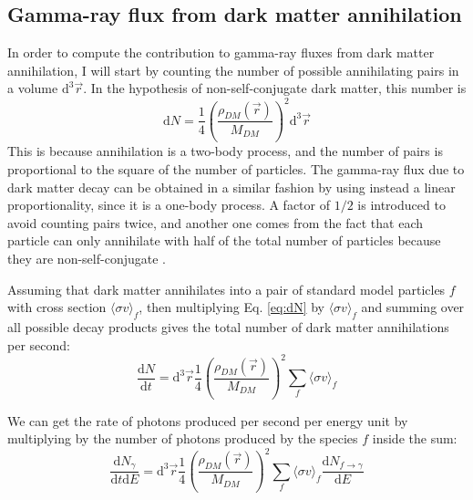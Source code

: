 \subsection{Gamma-ray flux from dark matter annihilation}
In order to compute the contribution to gamma-ray fluxes from dark matter annihilation, I will start by counting the number of possible annihilating pairs in a volume \(\mathrm{d}^3 \vec{r}\). In the hypothesis of non-self-conjugate dark matter, this number is
\begin{equation}\label{eq:dN}
	\mathrm{d} N = \frac{1}{4} \left( \frac{\rho_{DM} (\vec{r})}{M_{DM} } \right) ^2 \mathrm{d}^3 \vec{r}
\end{equation}
This is because annihilation is a two-body process, and the number of pairs is proportional to the square of the number of particles. The gamma-ray flux due to dark matter decay can be obtained in a similar fashion by using instead a linear proportionality, since it is a one-body process. A factor of \(1 /2\) is introduced to avoid counting pairs twice, and another one comes from the fact that each particle can only annihilate with half of the total number of particles because they are non-self-conjugate \cite{Sala_2019}.

Assuming that dark matter annihilates into a pair of standard model particles \(f\) with cross section \(\langle \sigma v \rangle_f \), then multiplying Eq. \eqref{eq:dN} by \(\langle \sigma v \rangle_f \) and summing over all possible decay products gives the total number of dark matter annihilations per second:
\begin{equation}
	\frac{\mathrm{d}N}{\mathrm{d}t} = \mathrm{d} ^3 \vec{r} \frac{1}{4} \left( \frac{\rho_{DM} (\vec{r})}{M_{DM} } \right)^2 \sum_{f} \langle \sigma v \rangle_f
\end{equation}

We can get the rate of photons produced per second per energy unit by multiplying by the number of photons produced by the species \(f\) inside the sum:
\begin{equation}
	\frac{\mathrm{d}N_{\gamma } }{\mathrm{d}t \mathrm{d} E} = \mathrm{d} ^3 \vec{r} \frac{1}{4} \left( \frac{\rho_{DM} (\vec{r})}{M_{DM} } \right)^2 \sum_{f} \langle \sigma v \rangle_f \frac{\mathrm{d}N_{f \to \gamma } }{\mathrm{d}E}
\end{equation}

